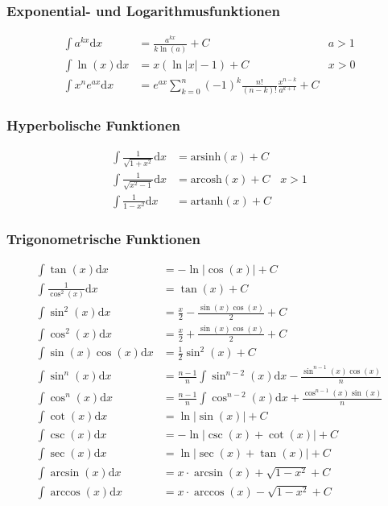 \documentclass[a3paper, 11pt, landscape]{scrartcl}
\begin{document}
\begin{multicols*}{3}
				\subsubsection{Exponential- und Logarithmusfunktionen}
					\vspace{-7pt}
					\begin{align*}
						\int a^{kx}\text{d}x&=\frac{a^{kx}}{k\ln(a)} +C &a>1\\
						\int \ln(x)\text{d}x&=x\left(\ln\vert x \vert -1 \right)+C &x>0\\
						\int x^ne^{ax}\text{d}x&=e^{ax}\sum_{k=0}^{n}(-1)^k \frac{n!}{(n-k)!} \frac{x^{n-k}}{a^{k+1}}+C	
					\end{align*}
				\subsubsection{Hyperbolische Funktionen}
					\vspace{-7pt}
					\begin{align*}
						\int \frac{1}{\sqrt{1+x^2}}\text{d}x&=\text{arsinh}(x)+C\\
						\int \frac{1}{\sqrt{x^2-1}}\text{d}x&=\text{arcosh}(x)+C &x>1\\
						\int \frac{1}{1-x^2}\text{d}x&=\text{artanh}(x)+C
					\end{align*}
				\subsubsection{Trigonometrische Funktionen}	
					\vspace{-7pt}
					\begin{align*}
						\int \tan(x) \text{d}x&=-\ln\vert \cos(x) \vert + C\\
						\int \frac{1}{\cos^2(x)}\text{d}x&=\tan(x)+C\\
						\int \sin^2(x)\text{d}x&= \frac{x}{2}-\frac{\sin(x)\cos(x)}{2}+C\\
						\int \cos^2(x)\text{d}x&= \frac{x}{2}+\frac{\sin(x)\cos(x)}{2}+C\\
						\int \sin(x)\cos(x)\text{d}x&= \frac{1}{2}\sin^2(x)+C\\
						\int \sin^n(x)\text{d}x&=\frac{n-1}{n}\int \sin^{n-2}(x)\text{d}x-\frac{\sin^{n-1}(x)\cos(x)}{n}\\
						\int \cos^n(x)\text{d}x&=\frac{n-1}{n}\int \cos^{n-2}(x)\text{d}x+\frac{\cos^{n-1}(x)\sin(x)}{n}\\
						\int \cot(x)\text{d}x&= \ln\vert \sin(x) \vert +C\\
						\int \csc(x)\text{d}x&=-\ln \vert \csc(x)+\cot(x)\vert +C\\
						\int \sec(x)\text{d}x&= \ln \vert \sec(x)+\tan(x) \vert +C\\
						\int \arcsin(x)\text{d}x&= x\cdot \arcsin(x)+\sqrt{1-x^2}+C\\
						\int \arccos(x)\text{d}x&=x\cdot \arccos(x)-\sqrt{1-x^2}+C
					\end{align*}
		

\end{multicols*}
\end{document}
